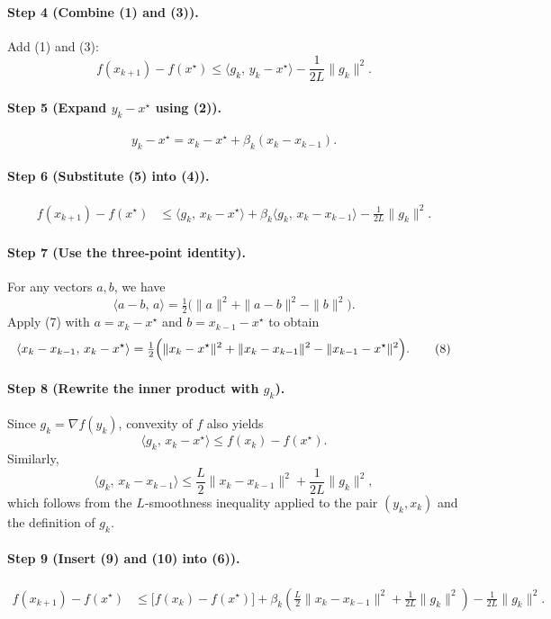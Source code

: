\documentclass{article}
\newcommand{\grad}{\nabla}
\begin{document}
\paragraph{Step 4 (Combine (1) and (3)).}
Add (1) and (3):
\[
f(x_{k+1})-f(x^\star)\le
\langle g_k,\,y_k-x^\star\rangle
-\frac{1}{2L}\|g_k\|^{2}.
\tag{4}
\]

\paragraph{Step 5 (Expand $y_k-x^\star$ using (2)).}
\[
y_k-x^\star = x_k-x^\star+\beta_k(x_k-x_{k-1}) .
\tag{5}
\]

\paragraph{Step 6 (Substitute (5) into (4)).}
\[
\begin{aligned}
f(x_{k+1})-f(x^\star)
&\le \langle g_k,\,x_k-x^\star\rangle
   +\beta_k\langle g_k,\,x_k-x_{k-1}\rangle
   -\frac{1}{2L}\|g_k\|^{2}.
\end{aligned}
\tag{6}
\]

\paragraph{Step 7 (Use the three‑point identity).}
For any vectors $a,b$, we have
\[
\langle a-b,\,a\rangle = \tfrac12\bigl(\|a\|^{2}+\|a-b\|^{2}-\|b\|^{2}\bigr).
\tag{7}
\]
Apply (7) with $a=x_k-x^\star$ and $b=x_{k-1}-x^\star$ to obtain
\[
\langle x_k-x_{k-1},\,x_k-x^\star\rangle
= \tfrac12\Bigl(\|x_k-x^\star\|^{2}+\|x_k-x_{k-1}\|^{2}-\|x_{k-1}-x^\star\|^{2}\Bigr).
\tag{8}
\]

\paragraph{Step 8 (Rewrite the inner product with $g_k$).}
Since $g_k=\grad f(y_k)$, convexity of $f$ also yields
\[
\langle g_k,\,x_k-x^\star\rangle\le f(x_k)-f(x^\star).
\tag{9}
\]
Similarly,
\[
\langle g_k,\,x_k-x_{k-1}\rangle
\le \frac{L}{2}\|x_k-x_{k-1}\|^{2}+ \frac{1}{2L}\|g_k\|^{2},
\tag{10}
\]
which follows from the $L$‑smoothness inequality applied to the pair $(y_k,x_k)$ and the definition of $g_k$.

\paragraph{Step 9 (Insert (9) and (10) into (6)).}
\[
\begin{aligned}
f(x_{k+1})-f(x^\star)
&\le \bigl[f(x_k)-f(x^\star)\bigr]
   +\beta_k\!\left(\frac{L}{2}\|x_k-x_{k-1}\|^{2}
                 +\frac{1}{2L}\|g_k\|^{2}\right)
   -\frac{1}{2L}\|g_k\|^{2}.
\end{aligned}
\tag{11}
\]
\end{document}
